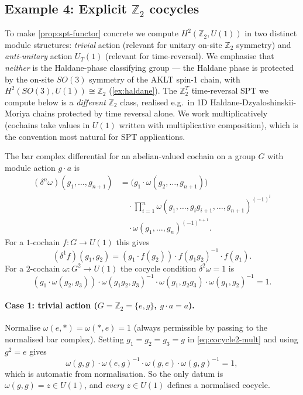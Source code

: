 \documentclass[12pt]{article}
\theoremstyle{plain}
\theoremstyle{definition}
\theoremstyle{remark}
\begin{document}
\subsection{\texorpdfstring{Example 4: Explicit $\mathbb{Z}_{2}$ cocycles}{Example 4: Explicit Z2 cocycles}}
\label{ex:z2-cocycle}

To make \cref{prop:spt-functor} concrete we compute $H^{2}(\mathbb{Z}_{2},U(1))$ in
two distinct module structures: \emph{trivial} action (relevant for unitary on-site
$\mathbb{Z}_{2}$ symmetry) and \emph{anti-unitary} action $U_{T}(1)$ (relevant for
time-reversal). We emphasise that \emph{neither} is the Haldane-phase classifying group
--- the Haldane phase is protected by the on-site $SO(3)$ symmetry of the AKLT spin-1
chain, with $H^{2}(SO(3),U(1))\cong\mathbb{Z}_{2}$ (\cref{ex:haldane}). The
$\mathbb{Z}_{2}^{T}$ time-reversal SPT we compute below is a \emph{different} $\mathbb{Z}_{2}$
class, realised e.g.\ in 1D Haldane-Dzyaloshinskii-Moriya chains protected by time
reversal alone. We work multiplicatively (cochains take values in $U(1)$ written with
multiplicative composition), which is the convention most natural for SPT applications.

The bar complex differential for an abelian-valued cochain on a group $G$ with module
action $g\cdot a$ is
\begin{align*}
(\delta^{n}\omega)(g_{1},\ldots,g_{n+1})
&= \bigl(g_{1}\cdot\omega(g_{2},\ldots,g_{n+1})\bigr) \\
&\quad{}\cdot \prod_{i=1}^{n}\omega(g_{1},\ldots,g_{i}g_{i+1},\ldots,g_{n+1})^{(-1)^{i}} \\
&\quad{}\cdot \omega(g_{1},\ldots,g_{n})^{(-1)^{n+1}}.
\end{align*}
For a $1$-cochain $f:G\to U(1)$ this gives
\begin{equation}
\label{eq:delta1-mult}
(\delta^{1}f)(g_{1},g_{2}) = (g_{1}\cdot f(g_{2}))\cdot f(g_{1}g_{2})^{-1}\cdot f(g_{1}).
\end{equation}
For a $2$-cochain $\omega:G^{2}\to U(1)$ the cocycle condition $\delta^{2}\omega=1$ is
\begin{equation}
\label{eq:cocycle2-mult}
(g_{1}\cdot\omega(g_{2},g_{3}))\cdot\omega(g_{1}g_{2},g_{3})^{-1}\cdot\omega(g_{1},g_{2}g_{3})\cdot\omega(g_{1},g_{2})^{-1}=1.
\end{equation}

\paragraph{Case 1: trivial action ($G=\mathbb{Z}_{2}=\{e,g\}$, $g\cdot a=a$).}
Normalise $\omega(e,*)=\omega(*,e)=1$ (always permissible by passing to the normalised
bar complex). Setting $g_{1}=g_{2}=g_{3}=g$ in \cref{eq:cocycle2-mult} and using
$g^{2}=e$ gives
\[
\omega(g,g)\cdot\omega(e,g)^{-1}\cdot\omega(g,e)\cdot\omega(g,g)^{-1}=1,
\]
which is automatic from normalisation. So the only datum is $\omega(g,g)=z\in U(1)$, and
\emph{every} $z\in U(1)$ defines a normalised cocycle.
\end{document}
